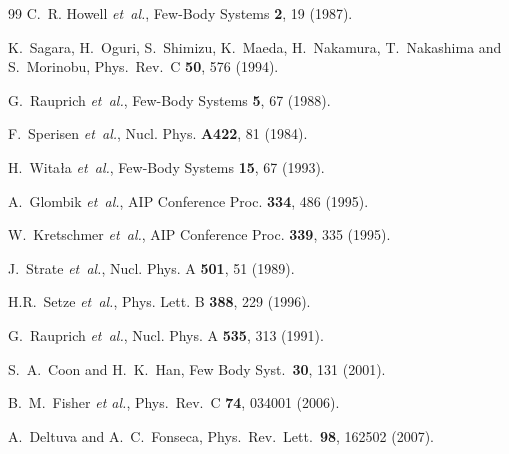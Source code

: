 \documentclass[aps,rmp,nofootinbib,twocolumn,floatfix]{revtex4}
\begin{document}
\begin{thebibliography}{99}
C.~R. Howell {\em et~al.},
Few-Body Systems {\bf 2}, 19 (1987).

  K.~Sagara, H.~Oguri, S.~Shimizu, K.~Maeda, H.~Nakamura, T.~Nakashima and S.~Morinobu,
  Phys.\ Rev.\  C {\bf 50}, 576 (1994).

G.~Rauprich {\em et~al.},
Few-Body Systems {\bf 5}, 67 (1988).

F.~Sperisen {\em et~al.},
Nucl. Phys. {\bf A422}, 81 (1984).

H.~Wita{\l}a {\em et~al.},
Few-Body Systems  {\bf 15}, 67 (1993).

A.~Glombik {\em et~al.},
AIP Conference Proc. {\bf 334}, 486 (1995).

W.~Kretschmer {\em et~al.},
AIP Conference Proc. {\bf 339}, 335 (1995).

J.~Strate {\em et~al.},
Nucl. Phys. A {\bf 501}, 51 (1989).


H.R.~Setze {\em et~al.},
Phys. Lett. B {\bf 388}, 229 (1996).

G.~Rauprich {\em et~al.},
Nucl. Phys. A {\bf 535}, 313 (1991).

  S.~A.~Coon and H.~K.~Han,
  Few Body Syst.\  {\bf 30}, 131 (2001).

  B.~M.~Fisher {\it et al.},
  Phys.\ Rev.\  C {\bf 74}, 034001 (2006).

  A.~Deltuva and A.~C.~Fonseca,
  Phys.\ Rev.\ Lett.\  {\bf 98}, 162502 (2007).


\end{thebibliography}
\end{document}
